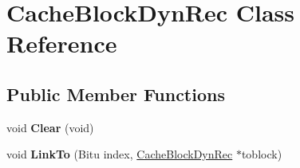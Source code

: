 \hypertarget{classCacheBlockDynRec}{\section{Cache\-Block\-Dyn\-Rec Class Reference}
\label{classCacheBlockDynRec}
}
\subsection*{Public Member Functions}
\begin{DoxyCompactItemize}
\item 
\hypertarget{classCacheBlockDynRec_aeaec04cb3b9ca0df1959427c02336208}{void {\bfseries Clear} (void)}\label{classCacheBlockDynRec_aeaec04cb3b9ca0df1959427c02336208}

\item 
\hypertarget{classCacheBlockDynRec_a1ff5bf4d36b3565a3fdab67d8e1167b8}{void {\bfseries Link\-To} (Bitu index, \hyperlink{classCacheBlockDynRec}{Cache\-Block\-Dyn\-Rec} $\ast$toblock)}\label{classCacheBlockDynRec_a1ff5bf4d36b3565a3fdab67d8e1167b8}

\end{DoxyCompactItemize}
